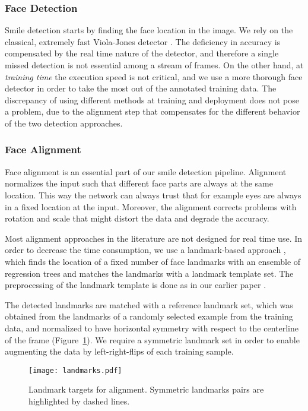 \documentclass[conference]{IEEEtran}
\begin{document}
\subsubsection{Face Detection}


Smile detection starts by finding the face location in the image. We rely on the classical, extremely fast Viola-Jones detector \cite{viola}. The deficiency in accuracy is compensated by the real time nature of the detector, and therefore a single missed detection is not essential among a stream of frames. On the other hand, at \textit{training time} the execution speed is not critical, and we use a more thorough face detector \cite{headhunter} in order to take the most out of the annotated training data. The discrepancy of using different methods at training and deployment does not pose a problem, due to the alignment step that compensates for the different behavior of the two detection approaches.

\subsubsection{Face Alignment}

Face alignment is an essential part of our smile detection pipeline. Alignment normalizes the input such that different face parts are always at the same location. This way the network can always trust that for example eyes are always in a fixed location at the input. Moreover, the alignment corrects problems with rotation and scale that might distort the data and degrade the accuracy.

Most alignment approaches in the literature are not designed for real time use. In order to decrease the time consumption, we use a landmark-based approach \cite{dlip}, which finds the location of a fixed number of face landmarks with an ensemble of regression trees and matches the landmarks with a landmark  template set. The preprocessing of the landmark template is done as in our earlier paper \cite{bai2018}.

The detected landmarks are matched with a reference landmark set, which was obtained from the landmarks of a randomly selected example from the training data, and normalized to have horizontal symmetry with respect to the centerline of the frame (Figure~\ref{fig:landmarks}). We require a symmetric landmark set in order to enable augmenting the data by left-right-flips of each training sample.


\begin{figure}
\centering
\texttt{[image: landmarks.pdf]}
\caption{Landmark targets for alignment. Symmetric landmarks pairs are highlighted by dashed lines.}\label{fig:landmarks}
\end{figure}
\end{document}
